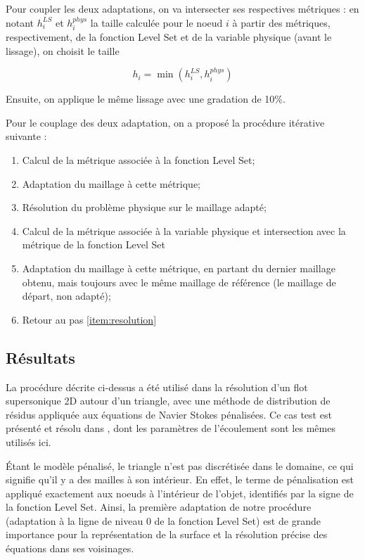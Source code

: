 \indent Pour coupler les deux adaptations, on va intersecter ses respectives métriques : en notant \(h_i^{LS}\) et \(h_i^{phys}\) la taille calculée pour le noeud \(i\) à partir des métriques, respectivement, de la fonction Level Set et de la variable physique (avant le lissage), on choisit le taille

\begin{equation*}
	h_i = \min(h_i^{LS},h_i^{phys})
\end{equation*}

\indent Ensuite, on applique le même lissage avec une gradation de 10\%.

\indent Pour le couplage des deux adaptation, on a proposé la procédure itérative suivante :  

\begin{enumerate}
	\item Calcul de la métrique associée à la fonction Level Set;
	\item Adaptation du maillage à cette métrique;
	\item \label{item:resolution} Résolution du problème physique sur le maillage adapté;
	\item Calcul de la métrique associée à la variable physique et intersection avec la métrique de la fonction Level Set 
	\item Adaptation du maillage à cette métrique, en partant du dernier maillage obtenu, mais toujours avec le même maillage de référence (le maillage de départ, non adapté);
	\item Retour au pas \ref{item:resolution}
\end{enumerate}

\subsection{Résultats}

\indent La procédure décrite ci-dessus a été utilisé dans la résolution d'un flot supersonique 2D autour d'un triangle, avec une méthode de distribution de résidus appliquée aux équations de Navier Stokes pénalisées. Ce cas test est présenté et résolu dans \cite{leo}, dont les paramètres de l'écoulement sont les mêmes utilisés ici.

\indent Étant le modèle pénalisé, le triangle n'est pas discrétisée dans le domaine, ce qui signifie qu'il y a des mailles à son intérieur. En effet, le terme de pénalisation est appliqué exactement aux noeuds à l'intérieur de l'objet, identifiés par la signe de la fonction Level Set. Ainsi, la première adaptation de notre procédure (adaptation à la ligne de niveau 0 de la fonction Level Set) est de grande importance pour la représentation de la surface et la résolution précise des équations dans ses voisinages.

